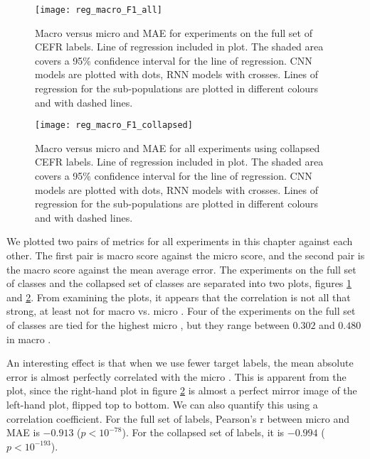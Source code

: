 \begin{figure}
  \centering
  \texttt{[image: reg\_macro\_F1\_all]}
  \caption[Macro \FI versus MAE]{
    Macro \FI versus micro \FI and MAE for experiments on the full set of
    CEFR labels. Line of regression included in plot. The shaded area covers
    a 95\% confidence interval for the line of regression. CNN models are
    plotted with dots, RNN models with crosses. Lines of regression for the
    sub-populations are plotted in different colours and with dashed lines.
  }
  \label{fig:reg_macro_F1_all}
\end{figure}

\begin{figure}
  \centering
  \texttt{[image: reg\_macro\_F1\_collapsed]}
  \caption[Macro \FI versus micro \FI and MAE]{
    Macro \FI versus micro \FI and MAE for all experiments using collapsed
    CEFR labels. Line of regression included in plot. The shaded area covers
    a 95\% confidence interval for the line of regression. CNN models are
    plotted with dots, RNN models with crosses. Lines of regression for the
    sub-populations are plotted in different colours and with dashed lines.
  }
  \label{fig:reg_macro_F1_collapsed}
\end{figure}

We plotted two pairs of metrics for all experiments in this chapter against
each other. The first pair is macro \FI score against the micro \FI score,
and the second pair is the macro \FI score against the mean average error.
The experiments on the full set of classes and the collapsed set of classes
are separated into two plots, figures \ref{fig:reg_macro_F1_all} and
\ref{fig:reg_macro_F1_collapsed}. From examining the plots, it appears that
the correlation is not all that strong, at least not for macro \FI vs. micro
\FI. Four of the experiments on the full set of classes are tied for the
highest micro \FI, but they range between $0.302$ and $0.480$ in macro \FI.

An interesting effect is that when we use fewer target labels, the mean
absolute error is almost perfectly correlated with the micro \FI. This is
apparent from the plot, since the right-hand plot in figure
\ref{fig:reg_macro_F1_collapsed} is almost a perfect mirror image of the
left-hand plot, flipped top to bottom. We can also quantify this using a
correlation coefficient. For the full set of labels, Pearson's r between
micro \FI and MAE is $-0.913$ ($p < 10^{-78}$). For the collapsed set of
labels, it is $-0.994$ ($p < 10^{-193}$). 

